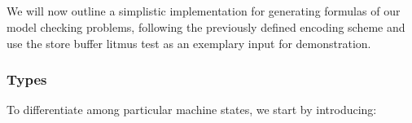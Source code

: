 



\newpage
\subsection{{\SMTLIB}}

We will now outline a simplistic {\CPP} implementation for generating {\SMTLIB} formulas of our model checking problems, following the previously defined encoding scheme
and use the store buffer litmus test as an exemplary input for demonstration.

\subsubsection*{Types}

To differentiate among particular machine states, we start by introducing:%


